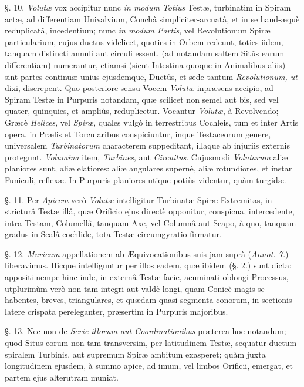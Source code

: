 \documentclass[a4paper, 11pt, oneside, polutonikogreek, german]{article}
\begin{document}
§. 10. \emph{Volutæ} vox accipitur nunc \emph{in modum Totius} Testæ, turbinatim in Spiram actæ, ad differentiam Univalvium, Conchâ simpliciter-arcuatâ, et in se haud-æquè reduplicatâ, incedentium; nunc \emph{in modum Partis}, vel Revolutionum Spiræ particularium, cujus ductus videlicet, quoties in Orbem redeunt, toties iidem, tanquam distincti annuli aut circuli essent, (ad notandam saltem Sitûs earum differentiam) numerantur, etiamsi (sicut Intestina quoque in Animalibus aliis) sint partes continuæ unius ejusdemque, Ductûs, et sede tantum \emph{Revolutionum, ut} dixi, discrepent. Quo posteriore sensu Vocem \emph{Volutæ} inpræsens accipio, ad Spiram Testæ in Purpuris notandam, quæ scilicet non semel aut bis, sed vel quater, quinquies, et ampliùs, reduplicetur. Vocantur \emph{Volutæ}, à Revolvendo; Græcè \emph{Helices}, vel \emph{Spiræ}, quales vulgò in terrestribus Cochleis, tum et inter Artis opera, in Prælis et Torcularibus conspiciuntur, inque Testaceorum genere, universalem \emph{Turbinatorum} characterem suppeditant, illaque ab injuriis externis protegunt. \emph{Volumina} item, \emph{Turbines}, aut \emph{Circuitus}. Cujusmodi \emph{Volutarum} aliæ planiores sunt, aliæ elatiores: aliæ angulares supernè, aliæ rotundiores, et instar Funiculi, reflexæ. In Purpuris planiores utique potiùs videntur, quàm turgidæ.

§. 11. Per \emph{Apicem} verò \emph{Volutæ} intelligitur Turbinatæ Spiræ Extremitas, in stricturâ Testæ illâ, quæ Orificio ejus directè opponitur, conspicua, intercedente, intra Testam, Columellâ, tanquam Axe, vel Columnâ aut Scapo, à quo, tanquam gradus in Scalâ cochlide, tota Testæ circumgyratio firmatur.

§. 12. \emph{Muricum} appellationem ab Æquivocationibus suis jam suprà (\emph{Annot. 7.}) liberavimus. Hîcque intelliguntur per illos eadem, quæ ibidem (§. 2.) sunt dicta: appositi nempe hinc inde, in externâ Testæ facie, acuminati oblongi Processus, utplurimùm verò non tam integri aut valdè longi, quam Conicè magis se habentes, breves, triangulares, et quædam quasi segmenta conorum, in sectionis latere crispata pereleganter, præsertim in Purpuris majoribus.

§. 13. Nec non de \emph{Serie illorum aut Coordinationibus} præterea hoc notandum; quod Situs eorum non tam transversim, per latitudinem Testæ, sequatur ductum spiralem Turbinis, aut supremum Spiræ ambitum exasperet; quàm juxta longitudinem ejusdem, à summo apice, ad imum, vel limbos Orificii, emergat, et partem ejus alterutram muniat.
\end{document}
